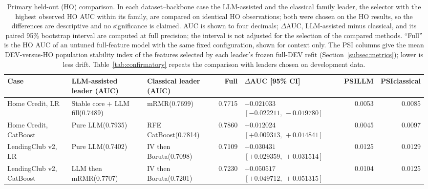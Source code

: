 \documentclass[final,5p,twocolumn]{elsarticle}
\begin{document}
\begin{table}[htbp]
\centering
\scriptsize
\setlength{\tabcolsep}{3pt}
\begin{threeparttable}
\caption{Primary held-out (HO) comparison. In each dataset--backbone case the LLM-assisted and the classical family leader, the selector with the highest observed HO AUC within its family, are compared on identical HO observations; both were chosen on the HO results, so the differences are descriptive and no significance is claimed. AUC is shown to four decimals; $\Delta$AUC, LLM-assisted minus classical, and its paired 95\% bootstrap interval are computed at full precision; the interval is not adjusted for the selection of the compared methods. ``Full'' is the HO AUC of an untuned full-feature model with the same fixed configuration, shown for context only. The PSI columns give the mean DEV-versus-HO population stability index of the features selected by each leader's frozen full-DEV refit (Section~\ref{subsec:metrics}); lower is less drift. Table~\ref{tab:confirmatory} repeats the comparison with leaders chosen on development data.}
\label{tab:primary_results}
\begin{tabular}{@{}L{24mm}L{27mm}L{24mm}rL{38mm}rr@{}}
\toprule
Case & LLM-assisted leader (AUC) & Classical leader (AUC) & Full & $\Delta$AUC [95\% CI] & PSI\newline LLM & PSI\newline classical \\
\midrule
Home Credit, LR & Stable core + LLM fill\newline (0.7489) & mRMR\newline (0.7699) & 0.7715 & $-0.021033$\newline $[-0.022211,\,-0.019780]$ & 0.0053 & 0.0085 \\
\addlinespace
Home Credit, CatBoost & Pure LLM\newline (0.7935) & RFE CatBoost\newline (0.7814) & 0.7860 & $+0.012024$\newline $[+0.009313,\,+0.014841]$ & 0.0045 & 0.0097 \\
\addlinespace
LendingClub v2, LR & Pure LLM\newline (0.7402) & IV then Boruta\newline (0.7098) & 0.7109 & $+0.030431$\newline $[+0.029359,\,+0.031514]$ & 0.0125 & 0.0129 \\
\addlinespace
LendingClub v2, CatBoost & LLM then mRMR\newline (0.7707) & IV then Boruta\newline (0.7201) & 0.7230 & $+0.050517$\newline $[+0.049712,\,+0.051315]$ & 0.0104 & 0.0125 \\

\end{tabular}
\end{threeparttable}
\end{table}
\end{document}
